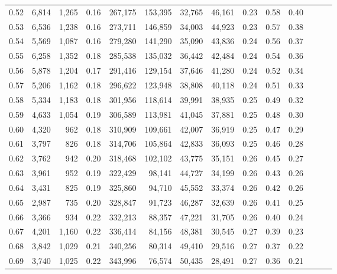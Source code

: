 \begin{tabular}{rrrrrrrrrrrrrr}
0.52 &   6,814 &  1,265 &  0.16 &  267,175 &  153,395 &  32,765 &  46,161 &  0.23 &  0.58 &      0.40 \\
0.53 &   6,536 &  1,238 &  0.16 &  273,711 &  146,859 &  34,003 &  44,923 &  0.23 &  0.57 &      0.38 \\
0.54 &   5,569 &  1,087 &  0.16 &  279,280 &  141,290 &  35,090 &  43,836 &  0.24 &  0.56 &      0.37 \\
0.55 &   6,258 &  1,352 &  0.18 &  285,538 &  135,032 &  36,442 &  42,484 &  0.24 &  0.54 &      0.36 \\
0.56 &   5,878 &  1,204 &  0.17 &  291,416 &  129,154 &  37,646 &  41,280 &  0.24 &  0.52 &      0.34 \\
0.57 &   5,206 &  1,162 &  0.18 &  296,622 &  123,948 &  38,808 &  40,118 &  0.24 &  0.51 &      0.33 \\
0.58 &   5,334 &  1,183 &  0.18 &  301,956 &  118,614 &  39,991 &  38,935 &  0.25 &  0.49 &      0.32 \\
0.59 &   4,633 &  1,054 &  0.19 &  306,589 &  113,981 &  41,045 &  37,881 &  0.25 &  0.48 &      0.30 \\
0.60 &   4,320 &    962 &  0.18 &  310,909 &  109,661 &  42,007 &  36,919 &  0.25 &  0.47 &      0.29 \\
0.61 &   3,797 &    826 &  0.18 &  314,706 &  105,864 &  42,833 &  36,093 &  0.25 &  0.46 &      0.28 \\
0.62 &   3,762 &    942 &  0.20 &  318,468 &  102,102 &  43,775 &  35,151 &  0.26 &  0.45 &      0.27 \\
0.63 &   3,961 &    952 &  0.19 &  322,429 &   98,141 &  44,727 &  34,199 &  0.26 &  0.43 &      0.26 \\
0.64 &   3,431 &    825 &  0.19 &  325,860 &   94,710 &  45,552 &  33,374 &  0.26 &  0.42 &      0.26 \\
0.65 &   2,987 &    735 &  0.20 &  328,847 &   91,723 &  46,287 &  32,639 &  0.26 &  0.41 &      0.25 \\
0.66 &   3,366 &    934 &  0.22 &  332,213 &   88,357 &  47,221 &  31,705 &  0.26 &  0.40 &      0.24 \\
0.67 &   4,201 &  1,160 &  0.22 &  336,414 &   84,156 &  48,381 &  30,545 &  0.27 &  0.39 &      0.23 \\
0.68 &   3,842 &  1,029 &  0.21 &  340,256 &   80,314 &  49,410 &  29,516 &  0.27 &  0.37 &      0.22 \\
0.69 &   3,740 &  1,025 &  0.22 &  343,996 &   76,574 &  50,435 &  28,491 &  0.27 &  0.36 &      0.21 \\

\end{tabular}
